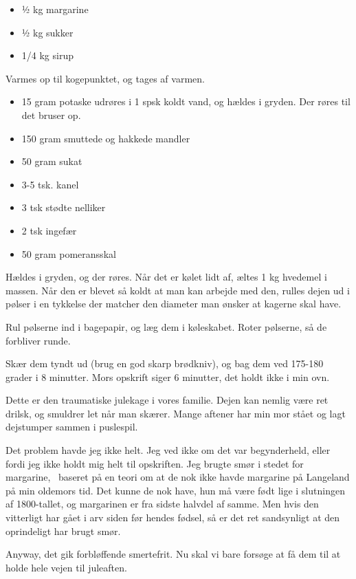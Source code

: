 \documentclass[
]{book}
\providecommand{\tightlist}{%
  \setlength{\itemsep}{0pt}\setlength{\parskip}{0pt}}
\begin{document}
\begin{itemize}
\tightlist
\item
  ½ kg margarine
\item
  ½ kg sukker
\item
  1/4 kg sirup
\end{itemize}

Varmes op til kogepunktet, og tages af varmen.

\begin{itemize}
\tightlist
\item
  15 gram potaske udrøres i 1 spsk koldt vand, og hældes i gryden. Der røres til det bruser op.
\item
  150 gram smuttede og hakkede mandler
\item
  50 gram sukat
\item
  3-5 tsk. kanel
\item
  3 tsk stødte nelliker
\item
  2 tsk ingefær
\item
  50 gram pomeransskal
\end{itemize}

Hældes i gryden, og der røres. Når det er kølet lidt af, æltes 1 kg hvedemel i massen. Når den er blevet så koldt at man kan arbejde med den, rulles dejen ud i pølser i en tykkelse der matcher den diameter man ønsker at kagerne skal have.

Rul pølserne ind i bagepapir, og læg dem i køleskabet. Roter pølserne, så de forbliver runde.

Skær dem tyndt ud (brug en god skarp brødkniv), og bag dem ved 175-180 grader i 8 minutter. Mors opskrift siger 6 minutter, det holdt ikke i min ovn.

Dette er den traumatiske julekage i vores familie. Dejen kan nemlig være ret drilsk, og smuldrer let når man skærer. Mange aftener har min mor stået og lagt dejstumper sammen i puslespil.

Det problem havde jeg ikke helt. Jeg ved ikke om det var begynderheld, eller fordi jeg ikke holdt mig helt til opskriften. Jeg brugte smør i stedet for margarine,~ baseret på en teori om at de nok ikke havde margarine på Langeland på min oldemors tid. Det kunne de nok have, hun må være født lige i slutningen af 1800-tallet, og margarinen er fra sidste halvdel af samme. Men hvis den vitterligt har gået i arv siden før hendes fødsel, så er det ret sandsynligt at den oprindeligt har brugt smør.

Anyway, det gik forbløffende smertefrit. Nu skal vi bare forsøge at få dem til at holde hele vejen til juleaften.
\end{document}
